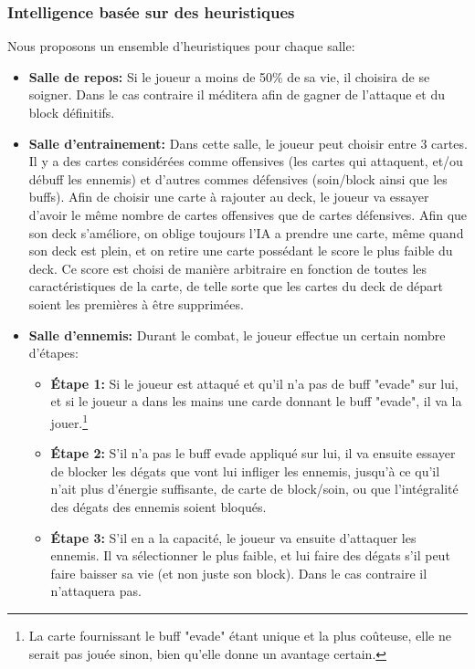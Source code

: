     \subsubsection{Intelligence basée sur des heuristiques}
        Nous proposons un ensemble d'heuristiques pour chaque salle:
        \begin{itemize}
            \item \textbf{Salle de repos:} Si le joueur a moins de 50\% de sa vie, il choisira de se soigner. Dans le cas contraire il méditera afin de gagner de l'attaque et du block définitifs.
            \item \textbf{Salle d'entrainement:} Dans cette salle, le joueur peut choisir entre 3 cartes. Il y a des cartes considérées comme offensives (les cartes qui attaquent, et/ou débuff les ennemis) et d'autres commes défensives (soin/block ainsi que les buffs). Afin de choisir une carte à rajouter au deck, le joueur va essayer d'avoir le même nombre de cartes offensives que de cartes défensives. Afin que son deck s'améliore, on oblige toujours l'IA a prendre une carte, même quand son deck est plein, et on retire une carte possédant le score le plus faible du deck. Ce score est choisi de manière arbitraire en fonction de toutes les caractéristiques de la carte, de telle sorte que les cartes du deck de départ soient les premières à être supprimées.
            \item \textbf{Salle d'ennemis:} Durant le combat, le joueur effectue un certain nombre d'étapes:
            \begin{itemize}
                \item \textbf{\'Etape 1:} Si le joueur est attaqué et qu'il n'a pas de buff "evade" sur lui, et si le joueur a dans les mains une carde donnant le buff "evade", il va la jouer.\footnote{La carte fournissant le buff "evade" étant unique et la plus coûteuse, elle ne serait pas jouée sinon, bien qu'elle donne un avantage certain.}
                \item \textbf{\'Etape 2:} S'il n'a pas le buff evade appliqué sur lui, il va ensuite essayer de blocker les dégats que vont lui infliger les ennemis, jusqu'à ce qu'il n'ait plus d'énergie suffisante, de carte de block/soin, ou que l'intégralité des dégats des ennemis soient bloqués.
                \item \textbf{\'Etape 3:} S'il en a la capacité, le joueur va ensuite d'attaquer les ennemis. Il va sélectionner le plus faible, et lui faire des dégats s'il peut faire baisser sa vie (et non juste son block). Dans le cas contraire il n'attaquera pas.

\end{itemize}
\end{itemize}
